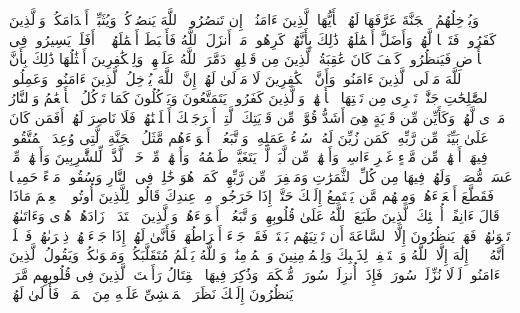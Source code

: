 \startbuffer[\q:47:6]
وَیُدۡخِلُهُمُ ٱلۡجَنَّةَ عَرَّفَهَا لَهُمۡ%
\stopbuffer
\startbuffer[\q:47:7]
یَٰۤأَیُّهَا ٱلَّذِینَ ءَامَنُوۤا۟ إِن تَنصُرُوا۟ ٱللَّهَ یَنصُرۡكُمۡ وَیُثَبِّتۡ أَقۡدَامَكُمۡ%
\stopbuffer
\startbuffer[\q:47:8]
وَٱلَّذِینَ كَفَرُوا۟ فَتَعۡسࣰا لَّهُمۡ وَأَضَلَّ أَعۡمَٰلَهُمۡ%
\stopbuffer
\startbuffer[\q:47:9]
ذَٰلِكَ بِأَنَّهُمۡ كَرِهُوا۟ مَاۤ أَنزَلَ ٱللَّهُ فَأَحۡبَطَ أَعۡمَٰلَهُمۡ%
\stopbuffer
\startbuffer[\q:47:10]
۞ أَفَلَمۡ یَسِیرُوا۟ فِی ٱلۡأَرۡضِ فَیَنظُرُوا۟ كَیۡفَ كَانَ عَٰقِبَةُ ٱلَّذِینَ مِن قَبۡلِهِمۡۖ دَمَّرَ ٱللَّهُ عَلَیۡهِمۡۖ وَلِلۡكَٰفِرِینَ أَمۡثَٰلُهَا%
\stopbuffer
\startbuffer[\q:47:11]
ذَٰلِكَ بِأَنَّ ٱللَّهَ مَوۡلَى ٱلَّذِینَ ءَامَنُوا۟ وَأَنَّ ٱلۡكَٰفِرِینَ لَا مَوۡلَىٰ لَهُمۡ%
\stopbuffer
\startbuffer[\q:47:12]
إِنَّ ٱللَّهَ یُدۡخِلُ ٱلَّذِینَ ءَامَنُوا۟ وَعَمِلُوا۟ ٱلصَّٰلِحَٰتِ جَنَّٰتࣲ تَجۡرِی مِن تَحۡتِهَا ٱلۡأَنۡهَٰرُۖ وَٱلَّذِینَ كَفَرُوا۟ یَتَمَتَّعُونَ وَیَأۡكُلُونَ كَمَا تَأۡكُلُ ٱلۡأَنۡعَٰمُ وَٱلنَّارُ مَثۡوࣰى لَّهُمۡ%
\stopbuffer
\startbuffer[\q:47:13]
وَكَأَیِّن مِّن قَرۡیَةٍ هِیَ أَشَدُّ قُوَّةࣰ مِّن قَرۡیَتِكَ ٱلَّتِیۤ أَخۡرَجَتۡكَ أَهۡلَكۡنَٰهُمۡ فَلَا نَاصِرَ لَهُمۡ%
\stopbuffer
\startbuffer[\q:47:14]
أَفَمَن كَانَ عَلَىٰ بَیِّنَةࣲ مِّن رَّبِّهِۦ كَمَن زُیِّنَ لَهُۥ سُوۤءُ عَمَلِهِۦ وَٱتَّبَعُوۤا۟ أَهۡوَاۤءَهُم%
\stopbuffer
\startbuffer[\q:47:15]
مَّثَلُ ٱلۡجَنَّةِ ٱلَّتِی وُعِدَ ٱلۡمُتَّقُونَۖ فِیهَاۤ أَنۡهَٰرࣱ مِّن مَّاۤءٍ غَیۡرِ ءَاسِنࣲ وَأَنۡهَٰرࣱ مِّن لَّبَنࣲ لَّمۡ یَتَغَیَّرۡ طَعۡمُهُۥ وَأَنۡهَٰرࣱ مِّنۡ خَمۡرࣲ لَّذَّةࣲ لِّلشَّٰرِبِینَ وَأَنۡهَٰرࣱ مِّنۡ عَسَلࣲ مُّصَفࣰّىۖ وَلَهُمۡ فِیهَا مِن كُلِّ ٱلثَّمَرَٰتِ وَمَغۡفِرَةࣱ مِّن رَّبِّهِمۡۖ كَمَنۡ هُوَ خَٰلِدࣱ فِی ٱلنَّارِ وَسُقُوا۟ مَاۤءً حَمِیمࣰا فَقَطَّعَ أَمۡعَاۤءَهُمۡ%
\stopbuffer
\startbuffer[\q:47:16]
وَمِنۡهُم مَّن یَسۡتَمِعُ إِلَیۡكَ حَتَّىٰۤ إِذَا خَرَجُوا۟ مِنۡ عِندِكَ قَالُوا۟ لِلَّذِینَ أُوتُوا۟ ٱلۡعِلۡمَ مَاذَا قَالَ ءَانِفًاۚ أُو۟لَٰۤئِكَ ٱلَّذِینَ طَبَعَ ٱللَّهُ عَلَىٰ قُلُوبِهِمۡ وَٱتَّبَعُوۤا۟ أَهۡوَاۤءَهُمۡ%
\stopbuffer
\startbuffer[\q:47:17]
وَٱلَّذِینَ ٱهۡتَدَوۡا۟ زَادَهُمۡ هُدࣰى وَءَاتَىٰهُمۡ تَقۡوَىٰهُمۡ%
\stopbuffer
\startbuffer[\q:47:18]
فَهَلۡ یَنظُرُونَ إِلَّا ٱلسَّاعَةَ أَن تَأۡتِیَهُم بَغۡتَةࣰۖ فَقَدۡ جَاۤءَ أَشۡرَاطُهَاۚ فَأَنَّىٰ لَهُمۡ إِذَا جَاۤءَتۡهُمۡ ذِكۡرَىٰهُمۡ%
\stopbuffer
\startbuffer[\q:47:19]
فَٱعۡلَمۡ أَنَّهُۥ لَاۤ إِلَٰهَ إِلَّا ٱللَّهُ وَٱسۡتَغۡفِرۡ لِذَنۢبِكَ وَلِلۡمُؤۡمِنِینَ وَٱلۡمُؤۡمِنَٰتِۗ وَٱللَّهُ یَعۡلَمُ مُتَقَلَّبَكُمۡ وَمَثۡوَىٰكُمۡ%
\stopbuffer
\startbuffer[\q:47:20]
وَیَقُولُ ٱلَّذِینَ ءَامَنُوا۟ لَوۡلَا نُزِّلَتۡ سُورَةࣱۖ فَإِذَاۤ أُنزِلَتۡ سُورَةࣱ مُّحۡكَمَةࣱ وَذُكِرَ فِیهَا ٱلۡقِتَالُ رَأَیۡتَ ٱلَّذِینَ فِی قُلُوبِهِم مَّرَضࣱ یَنظُرُونَ إِلَیۡكَ نَظَرَ ٱلۡمَغۡشِیِّ عَلَیۡهِ مِنَ ٱلۡمَوۡتِۖ فَأَوۡلَىٰ لَهُمۡ%
